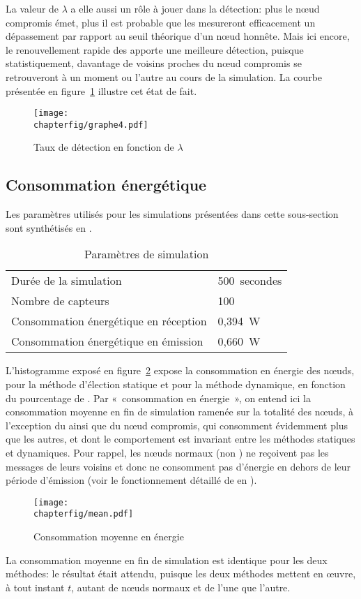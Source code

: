La valeur de $\lambda$ a elle aussi un rôle à jouer dans la détection: plus le nœud compromis émet, plus il est probable que les \cns mesureront efficacement un dépassement par rapport au seuil théorique d'un nœud honnête.
Mais ici encore, le renouvellement rapide des \cns apporte une meilleure détection, puisque statistiquement, davantage de voisins proches du nœud compromis se retrouveront \cn à un moment ou l'autre au cours de la simulation.
La courbe présentée en figure~\ref{sa:fig:graphe4} illustre cet état de fait.
\begin{figure}[H]
    \centering
    \texttt{[image: \\chapterfig/graphe4.pdf]}
    \caption{Taux de détection en fonction de $\lambda$}\label{sa:fig:graphe4}
\end{figure}

    \subsection{Consommation énergétique}

Les paramètres utilisés pour les simulations présentées dans cette sous-section sont synthétisés en .
\begin{table}[H]
    \centering
    \caption{Paramètres de simulation}\label{sa:table:parametres2}
    \medskip
    \begin{tabular}{ll}
        \toprule
        Durée de la simulation                & 500~secondes\\
        Nombre de capteurs                    & 100\\
        Consommation énergétique en réception & 0,394~W\\
        Consommation énergétique en émission  & 0,660~W\\
        \bottomrule
    \end{tabular}
\end{table}
L'histogramme exposé en figure~\ref{sa:fig:conso-moyenne} expose la consommation en énergie des nœuds, pour la méthode d'élection statique et pour la méthode dynamique, en fonction du pourcentage de \cns.
Par «~consommation en énergie~», on entend ici la consommation moyenne en fin de simulation ramenée sur la totalité des nœuds, à l'exception du \ch ainsi que du nœud compromis, qui consomment évidemment plus que les autres, et dont le comportement est invariant entre les méthodes statiques et dynamiques.
Pour rappel, les nœuds normaux (non \cns) ne reçoivent pas les messages de leurs voisins et donc ne consomment pas d'énergie en dehors de leur période d'émission (voir le fonctionnement détaillé de \leach en ).
\begin{figure}[H]
    \centering
    \texttt{[image: \\chapterfig/mean.pdf]}
    \caption{Consommation moyenne en énergie}\label{sa:fig:conso-moyenne}
\end{figure}
La consommation moyenne en fin de simulation est identique pour les deux méthodes: le résultat était attendu, puisque les deux méthodes mettent en œuvre, à tout instant $t$, autant de nœuds normaux et de \cns l'une que l'autre.


